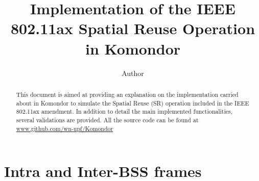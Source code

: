 \documentclass[]{article}
\begin{document}
	
	\title{Implementation of the IEEE 802.11ax Spatial Reuse Operation in Komondor}
	\author{Author}
	
	\date{}
	
	\maketitle
	
	
	
	\begin{abstract}
		This document is aimed at providing an explanation on the implementation carried about in Komondor to simulate the Spatial Reuse (SR) operation included in the IEEE 802.11ax amendment. In addition to detail the main implemented functionalities, several validations are provided. All the source code can be found at \url{www.github.com/wn-upf/Komondor}
	\end{abstract}
	
	
	\section{Intra and Inter-BSS frames} 
	\label{section:intra_inter_bss_frames}
	
\end{document}
